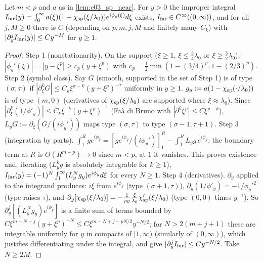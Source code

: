 \begin{lemma}
  \label{lem:c03_sp_far}
  Let $m<p$ and $a$ as in \cref{lem:c03_sp_near}. For $y>0$ the improper integral
  $I_{\textup{far}}(y)=\int_0^\infty a(\xi)(1-\chi_{\textup{sp}}(\xi/\lambda_0))e^{i\phi_y(\xi)}d\xi$ exists, $I_{\textup{far}}\in C^\infty((0,\infty))$, and for all $j,M\ge0$ there is $C$ (depending on $p,m,j,M$ and finitely many $C_k$) with $|\partial_y^jI_{\textup{far}}(y)|\le Cy^{-M}$ for $y\ge1$.
\end{lemma}
\begin{proof}
  Step 1 (nonstationarity). On the support ($\xi\ge1$, $\xi\le\frac34\lambda_0$ or $\xi\ge\frac32\lambda_0$): $|\phi_y'(\xi)|=|y-\xi^p|\ge c_p(y+\xi^p)$ with $c_p=\frac12\min(1-(3/4)^p,1-(2/3)^p)$.
  Step 2 (symbol class). Say $G$ (smooth, supported in the set of Step 1) is of type $(\sigma,\tau)$ if $|\partial_\xi^kG|\le C_k\xi^{\sigma-k}(y+\xi^p)^{-\tau}$ uniformly in $y\ge1$.
  $g_y:=a(1-\chi_{\textup{sp}}(\cdot/\lambda_0))$ is of type $(m,0)$ (derivatives of $\chi_{\textup{sp}}(\xi/\lambda_0)$ are supported where $\xi\approx\lambda_0$). Since $|\partial_\xi^k(1/\phi'_y)|\le C_k\xi^{-k}(y+\xi^p)^{-1}$ (Fa\`a di Bruno with $|\partial^k\xi^p|\le C\xi^{p-k}$), $L_yG:=\partial_\xi(G/(i\phi_y'))$ maps type $(\sigma,\tau)$ to type $(\sigma-1,\tau+1)$.
  Step 3 (integration by parts). $\int_1^Rge^{i\phi_y}=[ge^{i\phi_y}/(i\phi_y')]_1^R-\int_1^RL_yg\,e^{i\phi_y}$; the boundary term at $R$ is $O(R^{m-p})\to0$ since $m<p$, at $1$ it vanishes. This proves existence and, iterating ($L_y^kg$ is absolutely integrable for $k\ge1$),
  $I_{\textup{far}}(y)=(-1)^N\int_1^\infty(L_y^Ng_y)e^{i\phi_y}d\xi$ for every $N\ge1$.
  Step 4 (derivatives). $\partial_y$ applied to the integrand produces: $i\xi$ from $e^{i\phi_y}$ (type $(\sigma+1,\tau)$), $\partial_y(1/\phi'_y)=-1/\phi_y'^2$ (type raises $\tau$), and $\partial_y[\chi_{\textup{sp}}(\xi/\lambda_0)]=-\frac1{py}\frac\xi{\lambda_0}\chi_{\textup{sp}}'(\xi/\lambda_0)$ (type $(0,0)$ times $y^{-1}$).
  So $\partial_y^j[(L^N_yg_y)e^{i\phi_y}]$ is a finite sum of terms bounded by $C\xi^{m-N+j}(y+\xi^p)^{-N}\le C\xi^{m-N+j-pN/2}y^{-N/2}$; for $N>2(m+j+1)$ these are integrable uniformly for $y$ in compacts of $[1,\infty)$ (similarly of $(0,\infty)$), which justifies differentiating under the integral, and give $|\partial_y^jI_{\textup{far}}|\le Cy^{-N/2}$. Take $N\ge2M$.
\end{proof}

